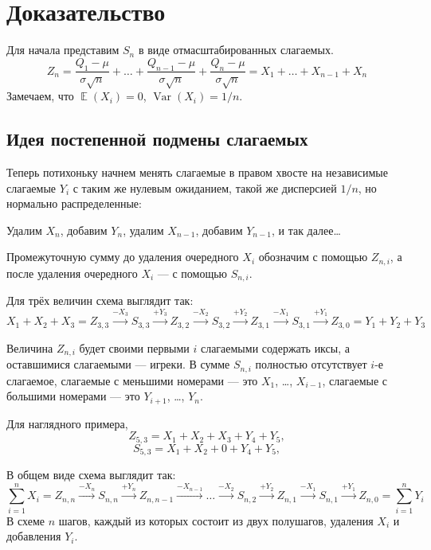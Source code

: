 \documentclass[
  letterpaper,
  DIV=11,
  numbers=noendperiod]{scrartcl}
\DeclareMathOperator{\E}{\mathbb{E}}
\DeclareMathOperator{\Var}{Var}
\begin{document}
\section{Доказательство}\label{sec-clt-proof}

Для начала представим \(S_n\) в виде отмасштабированных слагаемых. \[
Z_n = \frac{Q_1 - \mu}{\sigma \sqrt n} + \ldots + \frac{Q_{n-1} - \mu}{\sigma \sqrt n} + \frac{Q_n - \mu}{\sigma \sqrt n} = X_1 + \ldots + X_{n-1} + X_n
\] Замечаем, что \(\E(X_i) = 0\), \(\Var(X_i) = 1/n\).

\subsection{Идея постепенной подмены слагаемых}\label{sec-swapping-idea}

Теперь потихоньку начнем менять слагаемые в правом хвосте на независимые
слагаемые \(Y_i\) с таким же нулевым ожиданием, такой же дисперсией
\(1/n\), но нормально распределенные:

Удалим \(X_n\), добавим \(Y_n\), удалим \(X_{n-1}\), добавим
\(Y_{n-1}\), и так далее\ldots{}

Промежуточную сумму до удаления очередного \(X_i\) обозначим с помощью
\(Z_{n,i}\), а после удаления очередного \(X_i\) --- с помощью
\(S_{n,i}\).

Для трёх величин схема выглядит так: \[
X_1 + X_2 + X_3 = Z_{3,3} \overset{-X_3}{\longrightarrow}S_{3,3}\overset{+Y_3}{\longrightarrow}Z_{3,2}\overset{-X_2}{\longrightarrow}S_{3,2}\overset{+Y_2}{\longrightarrow}Z_{3,1}\overset{-X_1}{\longrightarrow}S_{3,1}\overset{+Y_1}{\longrightarrow}Z_{3,0}=Y_1 + Y_2 + Y_3
\]

Величина \(Z_{n,i}\) будет своими первыми \(i\) слагаемыми содержать
иксы, а оставшимися слагаемыми --- игреки. В сумме \(S_{n,i}\) полностью
отсутствует \(i\)-е слагаемое, слагаемые с меньшими номерами --- это
\(X_1\), \ldots, \(X_{i-1}\), слагаемые с большими номерами --- это
\(Y_{i+1}\), \ldots, \(Y_n\).

Для наглядного примера, \[
Z_{5, 3} = X_1 + X_2 + X_3 + Y_4 + Y_5,
\] \[
S_{5, 3} = X_1 + X_2 + 0 + Y_4 + Y_5,
\]

В общем виде схема выглядит так: \[
\sum_{i=1}^n X_i = Z_{n,n} \overset{-X_n}{\longrightarrow}S_{n,n}\overset{+Y_n}{\longrightarrow}Z_{n,n-1}\overset{-X_{n-1}}{\longrightarrow} \ldots \overset{-X_2}{\longrightarrow}S_{n,2}\overset{+Y_2}{\longrightarrow}Z_{n,1}\overset{-X_1}{\longrightarrow}S_{n,1}\overset{+Y_1}{\longrightarrow}Z_{n,0}=\sum_{i=1}^n Y_i
\] В схеме \(n\) шагов, каждый из которых состоит из двух полушагов,
удаления \(X_i\) и добавления \(Y_i\).
\end{document}
